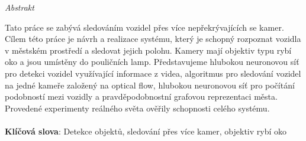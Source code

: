\vfill
\begin{center}
{\it \large Abstrakt}
\vspace{0.2cm}

\begin{minipage}{0.8\textwidth}{
Tato práce se zabývá sledováním vozidel přes více nepřekrývajících se kamer. Cílem této práce je návrh a realizace systému, který je schopný rozpoznat vozidla v městském prostředí a sledovat jejich polohu. Kamery mají objektiv typu rybí oko a jsou umístěny do pouličních lamp. Představujeme hlubokou neuronovou síť pro detekci vozidel využívající informace z videa, algoritmus pro sledování vozidel na jedné kameře založený na optical flow, hlubokou neuronovou síť pro počítání podobností mezi vozidly a pravděpodobnostní grafovou reprezentaci města. Provedené experimenty reálného světa ověřily schopnosti celého systému.
\\
\\
\textbf{Klíčová slova}: Detekce objektů, sledování přes více kamer, objektiv rybí oko
}
\end{minipage}
\end{center}
\vfill
\vspace{1cm}
\newpage{}